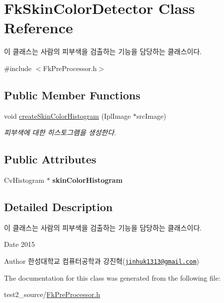 \hypertarget{class_fk_skin_color_detector}{}\section{Fk\+Skin\+Color\+Detector Class Reference}
\label{class_fk_skin_color_detector}


이 클래스는 사람의 피부색을 검출하는 기능을 담당하는 클래스이다.  




{\ttfamily \#include $<$Fk\+Pre\+Processor.\+h$>$}

\subsection*{Public Member Functions}
\begin{DoxyCompactItemize}
\item 
\hypertarget{class_fk_skin_color_detector_aafce9940347237e0cae88a7002c3dbd1}{}void \hyperlink{class_fk_skin_color_detector_aafce9940347237e0cae88a7002c3dbd1}{create\+Skin\+Color\+Histogram} (Ipl\+Image $\ast$src\+Image)\label{class_fk_skin_color_detector_aafce9940347237e0cae88a7002c3dbd1}

\begin{DoxyCompactList}\small\item\em 피부색에 대한 히스토그램을 생성한다. \end{DoxyCompactList}\end{DoxyCompactItemize}
\subsection*{Public Attributes}
\begin{DoxyCompactItemize}
\item 
\hypertarget{class_fk_skin_color_detector_a757fcb82a375a50b711a3c4cce4712be}{}Cv\+Histogram $\ast$ {\bfseries skin\+Color\+Histogram}\label{class_fk_skin_color_detector_a757fcb82a375a50b711a3c4cce4712be}

\end{DoxyCompactItemize}


\subsection{Detailed Description}
이 클래스는 사람의 피부색을 검출하는 기능을 담당하는 클래스이다. 

\begin{DoxyDate}{Date}
2015 
\end{DoxyDate}
\begin{DoxyAuthor}{Author}
한성대학교 컴퓨터공학과 강진혁(\href{mailto:jinhuk1313@gmail.com}{\tt jinhuk1313@gmail.\+com}) 
\end{DoxyAuthor}


The documentation for this class was generated from the following file\+:\begin{DoxyCompactItemize}
\item 
test2\+\_\+source/\hyperlink{_fk_pre_processor_8h}{Fk\+Pre\+Processor.\+h}\end{DoxyCompactItemize}

